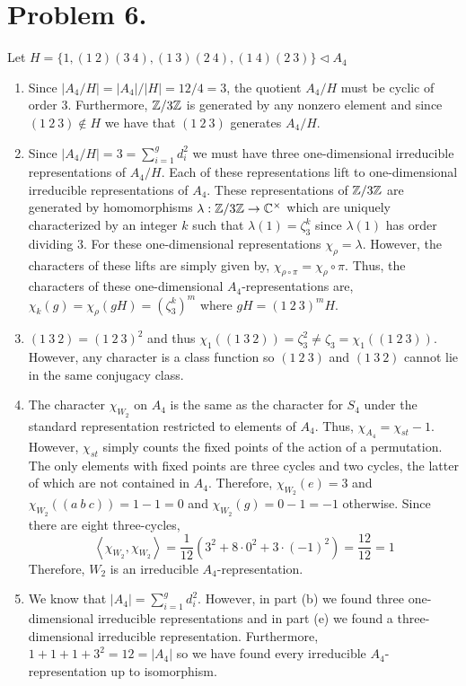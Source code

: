 \documentclass[12pt]{extarticle}
\begin{document}
\section*{Problem 6.}
Let $H = \{1, (1 \: 2)(3 \: 4), (1 \: 3)(2 \: 4), (1 \: 4)(2 \: 3) \} \triangleleft A_4$
\begin{enumerate}
\item Since $|A_4/H| = |A_4|/|H| = 12/4 = 3$, the quotient $A_4/H$ must be cyclic of order $3$. Furthermore, $\mathbb{Z}/3\mathbb{Z}$ is generated by any nonzero element and since $(1 \: 2 \: 3) \notin H$ we have that $(1 \: 2 \: 3)$ generates $A_4/H$. 

\item Since $|A_4/H| = 3 = \sum\limits_{i = 1}^g d_i^2$ we must have three one-dimensional irreducible representations of $A_4/H$. Each of these representations lift to one-dimensional irreducible representations of $A_4$. These representations of $\mathbb{Z} / 3 \mathbb{Z}$ are generated by homomorphisms $\lambda : \mathbb{Z} / 3 \mathbb{Z} \to \mathbb{C}^\times$ which are uniquely characterized by an integer $k$ such that $\lambda(1) = \zeta_3^k$ since $\lambda(1)$ has order dividing $3$. For these one-dimensional representations $\chi_{\rho} = \lambda$. However, the characters of these lifts are simply given by, $\chi_{\rho \circ \pi} = \chi_\rho \circ \pi$. Thus, the characters of these one-dimensional $A_4$-representations are, $\chi_k(g) = \chi_\rho(g H) = (\zeta_3^k)^m$ where $gH = (1 \: 2 \: 3)^m H$.

\item $(1 \: 3 \: 2) = (1 \: 2 \: 3)^2$ and thus $\chi_1((1 \: 3 \: 2)) = \zeta_3^2 \neq \zeta_3 = \chi_1((1 \: 2 \: 3))$. However, any character is a class function so $(1 \: 2 \: 3)$ and $(1 \: 3 \: 2)$ cannot lie in the same conjugacy class.  

\item The character $\chi_{W_2}$ on $A_4$ is the same as the character for $S_4$ under the standard representation restricted to elements of $A_4$. Thus, $\chi_{A_4} = \chi_{st} - 1$. However, $\chi_{st}$ simply counts the fixed points of the action of a permutation. The only elements with fixed points are three cycles and two cycles, the latter of which are not contained in $A_4$. Therefore, $\chi_{W_2}(e) = 3$ and $\chi_{W_2}((a \: b \: c)) = 1 - 1 = 0$ and $\chi_{W_2}(g) = 0 - 1 = - 1$ otherwise. Since there are eight three-cycles,
\[ \left< \chi_{W_2}, \chi_{W_2} \right> = \frac{1}{12} \left( 3^2 + 8 \cdot 0^2 + 3 \cdot (-1)^2 \right) = \frac{12}{12} = 1 \]
Therefore, $W_2$ is an irreducible $A_4$-representation.    

\item We know that $|A_4| = \sum\limits_{i = 1}^g d_i^2$. However, in part (b) we found three one-dimensional irreducible representations and in part (e) we found a three-dimensional irreducible representation. Furthermore, $1 + 1 + 1 + 3^2 = 12 = |A_4|$ so we have found every irreducible $A_4$-representation up to isomorphism. 
\end{enumerate}
\end{document}
